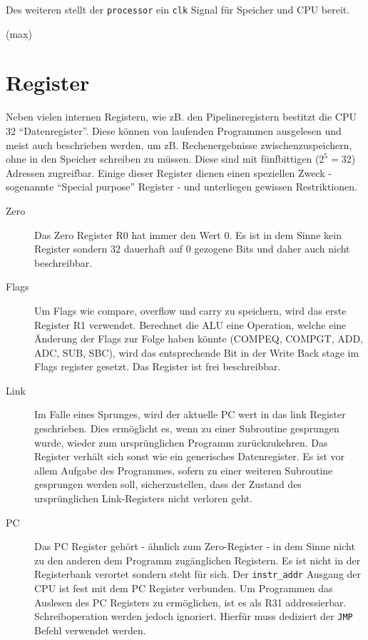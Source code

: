 \documentclass[paper=a4,fontsize=12pt,twocolumn]{scrreprt}
\begin{document}
Des weiteren stellt der \texttt{processor} ein \texttt{clk} Signal für Speicher und CPU bereit.

(max)

\section{Register}

Neben vielen internen Registern, wie zB. den Pipelineregistern bestitzt die CPU 32 \enquote{Datenregister}.
Diese können von laufenden Programmen ausgelesen und meist auch beschrieben werden, um zB. Rechenergebnisse zwischenzuspeichern, ohne in den Speicher schreiben zu müssen. 
Diese sind mit fünfbittigen ($2^5 = 32$) Adressen zugreifbar.
Einige dieser Register dienen einen speziellen Zweck - sogenannte \enquote{Special purpose} Register - und unterliegen gewissen Restriktionen.
\begin{description}
    \item[Zero]
        Das Zero Register R0 hat immer den Wert $0$.
        Es ist in dem Sinne kein Register sondern 32 dauerhaft auf 0 gezogene Bits und daher auch nicht beschreibbar.
    \item[Flags]
        Um Flags wie compare, overflow und carry zu speichern, wird das erste Register R1 verwendet.
        Berechnet die ALU eine Operation, welche eine Änderung der Flags zur Folge haben könnte (COMPEQ, COMPGT, ADD, ADC, SUB, SBC), wird das entsprechende Bit in der Write Back stage im Flags register gesetzt.
        Das Register ist frei beschreibbar.
    \item[Link]
        Im Falle eines Sprunges, wird der aktuelle PC wert in das link Register geschrieben.
        Dies ermöglicht es, wenn zu einer Subroutine gesprungen wurde, wieder zum ursprünglichen Programm zurückzukehren.
        Das Register verhält sich sonst wie ein generisches Datenregister.
        Es ist vor allem Aufgabe des Programmes, sofern zu einer weiteren Subroutine gesprungen werden soll, sicherzustellen, dass der Zustand des ursprünglichen Link-Registers nicht verloren geht. 
    \item[PC]
        Das PC Register gehört - ähnlich zum Zero-Register - in dem Sinne nicht zu den anderen dem Programm zugänglichen Registern.
        Es ist nicht in der Registerbank verortet sondern steht für sich.
        Der \texttt{instr\_addr} Ausgang der CPU ist fest mit dem PC Register verbunden.
        Um Programmen das Auslesen des PC Registers zu ermöglichen, ist es als R31 addressierbar. Schreiboperation werden jedoch ignoriert.
        Hierfür muss dediziert der \texttt{JMP} Befehl verwendet werden.
\end{description}
\end{document}
